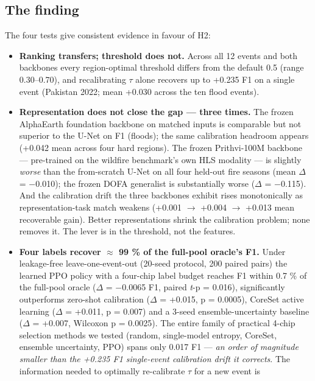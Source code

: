 \subsection{The finding}\label{the-finding}

The four tests give consistent evidence in favour of H2:

\begin{itemize}
\tightlist
\item
  \textbf{Ranking transfers; threshold does not.} Across all 12 events and
  both backbones every region-optimal threshold differs from the default
  0.5 (range 0.30--0.70), and recalibrating $\tau$ alone recovers up to +0.235
  F1 on a single event (Pakistan 2022; mean +0.030 across the ten flood
  events).
\item
  \textbf{Representation does not close the gap --- three times.} The frozen
  AlphaEarth foundation backbone on matched inputs is comparable but
  not superior to the U-Net on F1 (floods); the same calibration
  headroom appears (+0.042 mean across four hard regions). The frozen
  Prithvi-100M backbone --- pre-trained on the wildfire benchmark's own
  HLS modality --- is slightly \emph{worse} than the from-scratch U-Net on
  all four held-out fire seasons (mean $\Delta$ = $-$0.010); the frozen DOFA
  generalist is substantially worse ($\Delta$ = $-$0.115). And the calibration
  drift the three backbones exhibit rises monotonically as
  representation-task match weakens (+0.001 $\rightarrow$ +0.004 $\rightarrow$ +0.013 mean
  recoverable gain). Better representations shrink the calibration
  problem; none removes it. The lever is in the threshold, not the
  features.
\item
  \textbf{Four labels recover $\approx$ 99 \% of the full-pool oracle's F1.} Under
  leakage-free leave-one-event-out (20-seed protocol, 200 paired pairs)
  the learned PPO policy with a four-chip label budget reaches F1 within
  0.7 \% of the full-pool oracle ($\Delta$ = $-$0.0065 F1, paired \emph{t}-p = 0.016),
  significantly outperforms zero-shot calibration ($\Delta$ = +0.015, p =
  0.0005), CoreSet active learning ($\Delta$ = +0.011, p = 0.007) and a
  3-seed ensemble-uncertainty baseline ($\Delta$ = +0.007, Wilcoxon p =
  0.0025). The entire family of practical 4-chip selection methods we
  tested (random, single-model entropy, CoreSet, ensemble uncertainty,
  PPO) spans only 0.017 F1 --- \emph{an order of magnitude smaller than the
  +0.235 F1 single-event calibration drift it corrects}. The
  information needed to optimally re-calibrate $\tau$ for a new event is

\end{itemize}
